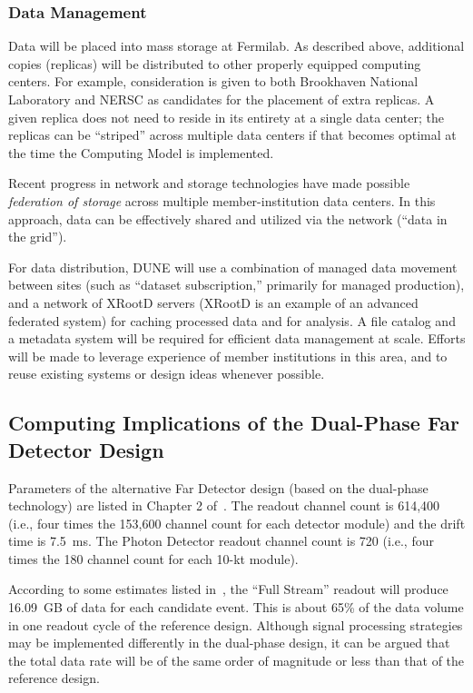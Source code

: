 \subsubsection{Data Management}
\label{sec:detectors-sc-infrastructure-computing-model-data-mgt}

Data will be placed into mass storage at Fermilab. As described
above, additional copies (replicas) will be distributed to other
properly equipped computing centers. For example, consideration is
given to both Brookhaven National Laboratory and NERSC as candidates
for the placement of extra replicas. A given replica does not need to
reside in its entirety at a single data center; the replicas can be
``striped'' across multiple data centers if that becomes optimal at
the time the Computing Model is implemented.

Recent progress in network and storage technologies have made possible
\textit{federation of storage} across multiple member-institution data centers. %
In this approach, data can be effectively shared
and utilized via the network (``data in the grid''). 

For data distribution, DUNE will use a combination of managed data movement between
sites (such as ``dataset subscription,'' primarily for managed
production), and a network of XRootD servers (XRootD is an example of an advanced federated system) for caching processed data
and for analysis.  A file catalog and a metadata system
will be required for efficient data management at scale. Efforts
will be made to leverage experience of member institutions in this
area, and to reuse existing systems or design ideas whenever
possible.

\subsection{Computing Implications of the Dual-Phase Far Detector Design}
\label{sec:detectors-sc-alternate}
Parameters of the alternative Far Detector design (based on the
dual-phase technology) are listed in Chapter 2 of~\cite{cdr-annex-rates}. The readout channel count is 614,400 (i.e., four times the
          153,600 channel count for each  detector module) and the drift time is 7.5~ms.
The Photon Detector readout channel count is 720 (i.e., four times the 180
          channel count for each 10-kt module).

According to some estimates listed in~\cite{cdr-annex-rates}, the ``Full Stream''
readout will produce 16.09~GB of data for each candidate event. This is
about 65\% of the data volume in one readout cycle of the reference
design.  Although signal processing strategies may be implemented
differently in the dual-phase design, it can be argued that the total
data rate will be of the same order of magnitude or less than that of the
reference design.


